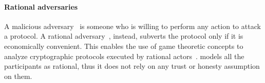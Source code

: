 \smallskip

\paragraph*{Rational adversaries}

A malicious adversary~\cite{Hazay10anote} is someone who is willing to perform any action to attack a protocol. A rational adversary~\cite{Groce2012}, instead, subverts the protocol only if it is economically convenient.
This enables the use of game theoretic concepts to analyze cryptographic protocols executed by rational actors~\cite{Asharov2016,raap,Provi07summaryreport}.
%
\shortname models all the participants as rational, thus it does not rely on any trust or honesty assumption on them.
